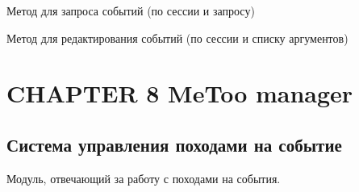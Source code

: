 \documentclass[letterpaper,10pt,english]{sphinxmanual}
\begin{document}
\begin{fulllineitems}
\begin{fulllineitems}
\end{fulllineitems}


\begin{fulllineitems}
\label{eventManager:mainServer.eventManager.EventManager.getEvents}
Метод для запроса событий (по сессии и запросу)

\end{fulllineitems}


\begin{fulllineitems}
\label{eventManager:mainServer.eventManager.EventManager.modifyEvent}
Метод для редактирования событий (по сессии и списку аргументов)

\end{fulllineitems}


\end{fulllineitems}



\chapter{CHAPTER 8 MeToo manager}
\label{MeTooManager:chapter-8-metoo-manager}\label{MeTooManager::doc}

\section{Система управления походами на событие}
\label{MeTooManager:id1}\label{MeTooManager:module-mainServer.MeTooManager}
Модуль, отвечающий за работу с походами на события.
\end{document}
